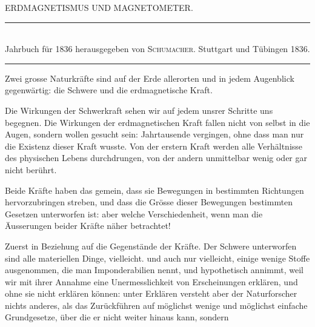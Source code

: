 \clearpage
{}
\GaussVSourceUnnumbered
{}
\begin{center}
{\large ERDMAGNETISMUS UND MAGNETOMETER.\par}
\bigskip
\rule{.70\linewidth}{.4pt}\\[.5\baselineskip]
{\small Jahrbuch für 1836 herausgegeben von \textsc{Schumacher}. Stuttgart und Tübingen 1836.}\\[.5\baselineskip]
\rule{.70\linewidth}{.4pt}
\end{center}

Zwei grosse Naturkräfte sind auf der Erde allerorten und in jedem Augenblick
gegenwärtig: die Schwere und die erdmagnetische Kraft.

Die Wirkungen der Schwerkraft sehen wir auf jedem unsrer Schritte uns
begegnen. Die Wirkungen der erdmagnetischen Kraft fallen nicht von selbst in
die Augen, sondern wollen gesucht sein: Jahrtausende vergingen, ohne dass man
nur die Existenz dieser Kraft wusste. Von der erstern Kraft werden alle Verhältnisse
des physischen Lebens durchdrungen, von der andern unmittelbar wenig
oder gar nicht berührt.

Beide Kräfte haben das gemein, dass sie Bewegungen in bestimmten Richtungen
hervorzubringen streben, und dass die Grösse dieser Bewegungen bestimmten
Gesetzen unterworfen ist: aber welche Verschiedenheit, wenn man die
Äusserungen beider Kräfte näher betrachtet!

Zuerst in Beziehung auf die Gegenstände der Kräfte. Der Schwere unterworfen
sind alle materiellen Dinge, vielleicht. und auch nur vielleicht, einige
wenige Stoffe ausgenommen, die man Imponderabilien nennt, und hypothetisch
annimmt, weil wir mit ihrer Annahme eine Unermesslichkeit von Erscheinungen
erklären, und ohne sie nicht erklären können: unter Erklären versteht aber
der Naturforscher nichts anderes, als das Zurückführen auf möglichst wenige und
möglichst einfache Grundgesetze, über die er nicht weiter hinaus kann, sondern
\clearpage
